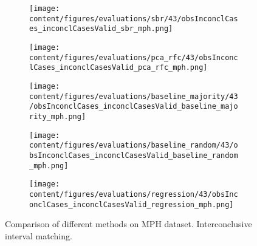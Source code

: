 \begin{figure}[t]
  \begin{subfigure}{0.5\textwidth}
    \centering
    \texttt{[image: content/figures/evaluations/sbr/43/obsInconclCases\_inconclCasesValid\_sbr\_mph.png]}
  \end{subfigure}
  \hfill
  \begin{subfigure}{0.5\textwidth}
    \centering
    \texttt{[image: content/figures/evaluations/pca\_rfc/43/obsInconclCases\_inconclCasesValid\_pca\_rfc\_mph.png]}
  \end{subfigure}
  \hfill
  \begin{subfigure}{0.5\textwidth}
    \centering
    \texttt{[image: content/figures/evaluations/baseline\_majority/43/obsInconclCases\_inconclCasesValid\_baseline\_majority\_mph.png]}
  \end{subfigure}
  \hfill
  \begin{subfigure}{0.5\textwidth}
    \centering
    \texttt{[image: content/figures/evaluations/baseline\_random/43/obsInconclCases\_inconclCasesValid\_baseline\_random\_mph.png]}
  \end{subfigure}
  \hfill
  \begin{subfigure}{0.5\textwidth}
    \centering
    \texttt{[image: content/figures/evaluations/regression/43/obsInconclCases\_inconclCasesValid\_regression\_mph.png]}
  \end{subfigure}

  \caption{Comparison of different methods on MPH dataset. Interconclusive interval matching.}
  \label{fig:test_interval_match_mph}
\end{figure}


